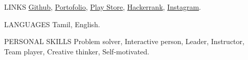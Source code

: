 \documentclass{template}
\begin{document}
\begin{rSection}{LINKS}
\href{https://github.com/princesanjivy}{Github},
\href{https://princesanjivy-portfolio.web.app/}{Portofolio},
\href{https://play.google.com/store/apps/dev?id=6439925551269057866}{Play Store},
\href{https://www.hackerrank.com/profile/sanjivy_android}{Hackerrank},
\href{https://www.instagram.com/princesanjivy}{Instagram}.

\end{rSection}

\begin{rSection}{LANGUAGES}
Tamil, English.

\end{rSection}

\begin{rSection}{PERSONAL SKILLS}
Problem solver, Interactive person, Leader, Instructor, Team player, Creative thinker,  Self-motivated.

\end{rSection}
\end{document}
